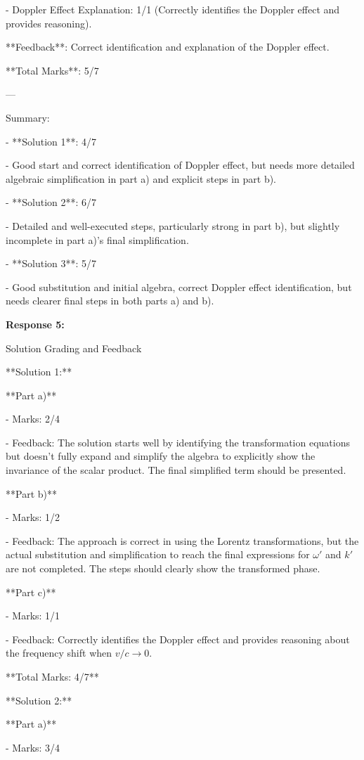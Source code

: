 \documentclass[a4paper,11pt]{article}
\begin{document}
- Doppler Effect Explanation: 1/1 (Correctly identifies the Doppler effect and provides reasoning).

**Feedback**: Correct identification and explanation of the Doppler effect.

**Total Marks**: 5/7

---

Summary:

- **Solution 1**: 4/7

  - Good start and correct identification of Doppler effect, but needs more detailed algebraic simplification in part a) and explicit steps in part b).

- **Solution 2**: 6/7

  - Detailed and well-executed steps, particularly strong in part b), but slightly incomplete in part a)'s final simplification.

- **Solution 3**: 5/7

  - Good substitution and initial algebra, correct Doppler effect identification, but needs clearer final steps in both parts a) and b).

\bigskip
\textbf{Response 5:}

Solution Grading and Feedback

**Solution 1:**

**Part a)**

- Marks: 2/4

- Feedback: The solution starts well by identifying the transformation equations but doesn't fully expand and simplify the algebra to explicitly show the invariance of the scalar product. The final simplified term should be presented.

**Part b)**

- Marks: 1/2

- Feedback: The approach is correct in using the Lorentz transformations, but the actual substitution and simplification to reach the final expressions for \(\omega'\) and \(k'\) are not completed. The steps should clearly show the transformed phase.

**Part c)**

- Marks: 1/1

- Feedback: Correctly identifies the Doppler effect and provides reasoning about the frequency shift when \(v/c \rightarrow 0\).

**Total Marks: 4/7**

**Solution 2:**

**Part a)**

- Marks: 3/4
\end{document}
